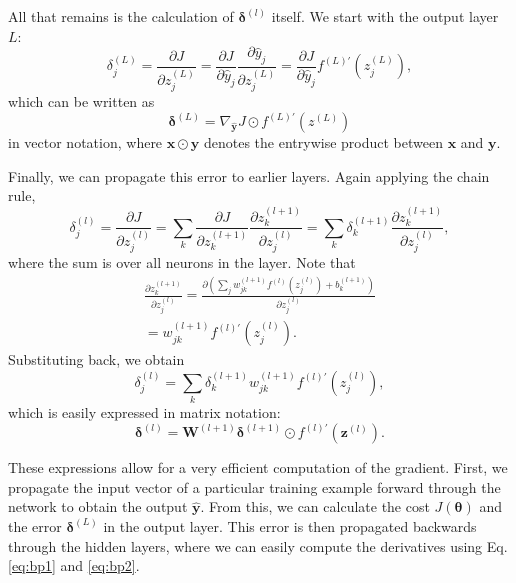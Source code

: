 All that remains is the calculation of $\bm{\delta}^{(l)}$ itself. We start with the output layer $L$:
\begin{equation}
\delta_j^{(L)} = \frac{\partial J}{\partial z_j^{(L)}}
= \frac{\partial J}{\partial \hat{y}_j} \frac{\partial \hat{y}_j}{\partial z_j^{(L)}}
= \frac{\partial J}{\partial \hat{y}_j} f^{(L)\prime}\left (z_j^{(L)}\right ),
\end{equation}
which can be written as
\begin{equation}
\bm{\delta}^{(L)} = \nabla_{\hat{\bm{y}}}J \odot f^{(L)\prime}\left (z^{(L)}\right )
\end{equation}
in vector notation, where $\bm{x} \odot \bm{y}$ denotes the entrywise product between $\bm{x}$ and $\bm{y}$.

Finally, we can propagate this error to earlier layers. Again applying the chain rule,
\begin{equation}
\delta_j^{(l)} = \frac{\partial J}{\partial z_j^{(l)}}
= \sum_k \frac{\partial J}{\partial z_k^{(l+1)}} \frac{\partial z_k^{(l+1)}}{\partial z_j^{(l)}}
= \sum_k \delta_k^{(l+1)} \frac{\partial z_k^{(l+1)}}{\partial z_j^{(l)}},
\end{equation}
where the sum is over all neurons in the  layer. Note that
\begin{equation}
\begin{gathered}
\frac{\partial z_k^{(l+1)}}{\partial z_j^{(l)}}
= \frac{\partial\left (
	\sum_j w_{jk}^{(l+1)}f^{(l)}\left (z_j^{(l)}\right )+b_k^{(l+1)}
	\right )}{\partial z_j^{(l)}}\\
= w_{jk}^{(l+1)}f^{(l)\prime}\left (z_j^{(l)}\right ).
\end{gathered}
\end{equation}
Substituting back, we obtain
\begin{equation}
\delta_j^{(l)} = \sum_k \delta_k^{(l+1)} w_{jk}^{(l+1)}f^{(l)\prime}\left (z_j^{(l)}\right ),
\end{equation}
which is easily expressed in matrix notation:
\begin{equation}
\bm{\delta}^{(l)} = \bm{W}^{(l+1)} \bm{\delta}^{(l+1)} \odot f^{(l)\prime}\left (\bm{z}^{(l)}\right ).
\end{equation}

These expressions allow for a very efficient computation of the gradient. First, we propagate the input vector of a particular training example forward through the network to obtain the output $\hat{\bm{y}}$. From this, we can calculate the cost $J(\bm{\theta})$ and the error $\bm{\delta}^{(L)}$ in the output layer. This error is then propagated backwards through the hidden layers, where we can easily compute the derivatives using Eq. \eqref{eq:bp1} and \eqref{eq:bp2}.

